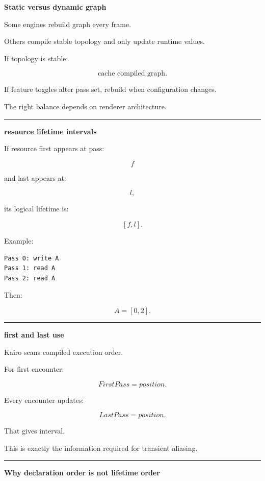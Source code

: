 \textbf{Static versus dynamic graph}

Some engines rebuild graph every frame.

Others compile stable topology and only update runtime values.

If topology is stable:

\[
\boxed{
\text{cache compiled graph}.
}
\]

If feature toggles alter pass set, rebuild when configuration changes.

The right balance depends on renderer architecture.

\begin{center}\rule{0.5\linewidth}{0.5pt}\end{center}

\textbf{resource lifetime intervals}

If resource first appears at pass:

\[
f
\]

and last appears at:

\[
l,
\]

its logical lifetime is:

\[
\boxed{
[f,l].
}
\]

Example:

\begin{verbatim}
Pass 0: write A
Pass 1: read A
Pass 2: read A
\end{verbatim}

Then:

\[
A=[0,2].
\]

\begin{center}\rule{0.5\linewidth}{0.5pt}\end{center}

\textbf{first and last use}

Kairo scans compiled execution order.

For first encounter:

\[
FirstPass=position.
\]

Every encounter updates:

\[
LastPass=position.
\]

That gives interval.

This is exactly the information required for transient aliasing.

\begin{center}\rule{0.5\linewidth}{0.5pt}\end{center}

\textbf{Why declaration order is not lifetime order}

